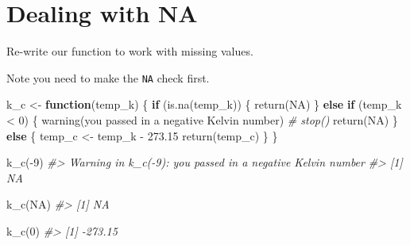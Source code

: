 \documentclass[
]{book}
\newenvironment{Shaded}{\begin{snugshade}}{\end{snugshade}}
\newcommand{\CommentTok}[1]{\textcolor[rgb]{0.56,0.35,0.01}{\textit{#1}}}
\newcommand{\ConstantTok}[1]{\textcolor[rgb]{0.00,0.00,0.00}{#1}}
\newcommand{\ControlFlowTok}[1]{\textcolor[rgb]{0.13,0.29,0.53}{\textbf{#1}}}
\newcommand{\DecValTok}[1]{\textcolor[rgb]{0.00,0.00,0.81}{#1}}
\newcommand{\FloatTok}[1]{\textcolor[rgb]{0.00,0.00,0.81}{#1}}
\newcommand{\FunctionTok}[1]{\textcolor[rgb]{0.00,0.00,0.00}{#1}}
\newcommand{\NormalTok}[1]{#1}
\newcommand{\OtherTok}[1]{\textcolor[rgb]{0.56,0.35,0.01}{#1}}
\newcommand{\SpecialCharTok}[1]{\textcolor[rgb]{0.00,0.00,0.00}{#1}}
\newcommand{\StringTok}[1]{\textcolor[rgb]{0.31,0.60,0.02}{#1}}
\begin{document}
\hypertarget{dealing-with-na}{%
\section{Dealing with NA}\label{dealing-with-na}}

Re-write our function to work with missing values.

Note you need to make the \texttt{NA} check first.

\begin{Shaded}
\begin{Highlighting}[]
\NormalTok{k\_c }\OtherTok{\textless{}{-}} \ControlFlowTok{function}\NormalTok{(temp\_k) \{}
    \ControlFlowTok{if}\NormalTok{ (}\FunctionTok{is.na}\NormalTok{(temp\_k)) \{}
        \FunctionTok{return}\NormalTok{(}\ConstantTok{NA}\NormalTok{)}
\NormalTok{    \} }\ControlFlowTok{else} \ControlFlowTok{if}\NormalTok{ (temp\_k }\SpecialCharTok{\textless{}} \DecValTok{0}\NormalTok{) \{}
        \FunctionTok{warning}\NormalTok{(}\StringTok{\textquotesingle{}you passed in a negative Kelvin number\textquotesingle{}}\NormalTok{)}
        \CommentTok{\# stop()}
        \FunctionTok{return}\NormalTok{(}\ConstantTok{NA}\NormalTok{)}
\NormalTok{    \} }\ControlFlowTok{else}\NormalTok{ \{}
\NormalTok{        temp\_c }\OtherTok{\textless{}{-}}\NormalTok{ temp\_k }\SpecialCharTok{{-}} \FloatTok{273.15}
        \FunctionTok{return}\NormalTok{(temp\_c)}
\NormalTok{    \}}
\NormalTok{\}}
\end{Highlighting}
\end{Shaded}

\begin{Shaded}
\begin{Highlighting}[]
\FunctionTok{k\_c}\NormalTok{(}\SpecialCharTok{{-}}\DecValTok{9}\NormalTok{)}
\CommentTok{\#\textgreater{} Warning in k\_c({-}9): you passed in a negative Kelvin number}
\CommentTok{\#\textgreater{} [1] NA}
\end{Highlighting}
\end{Shaded}

\begin{Shaded}
\begin{Highlighting}[]
\FunctionTok{k\_c}\NormalTok{(}\ConstantTok{NA}\NormalTok{)}
\CommentTok{\#\textgreater{} [1] NA}
\end{Highlighting}
\end{Shaded}

\begin{Shaded}
\begin{Highlighting}[]
\FunctionTok{k\_c}\NormalTok{(}\DecValTok{0}\NormalTok{)}
\CommentTok{\#\textgreater{} [1] {-}273.15}
\end{Highlighting}
\end{Shaded}
\end{document}
